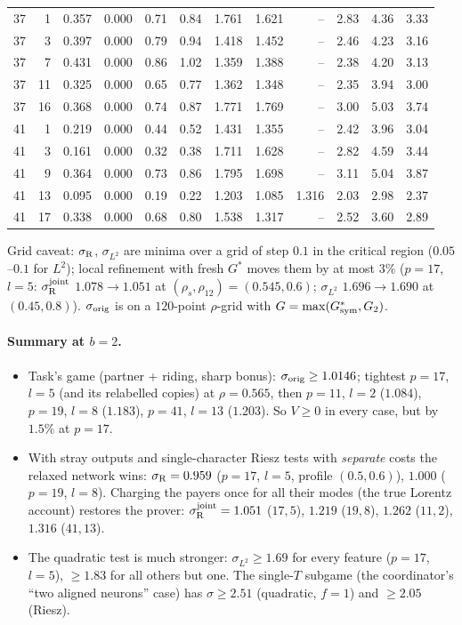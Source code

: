 \documentclass[11pt]{article}
\theoremstyle{definition}
\begin{document}
\begin{center}
\begin{longtable}{rr|rr|rr|r|rr|r|rr}
37 & 1 & 0.357 & 0.000 & 0.71 & 0.84 & 1.761 & 1.621 & -- & 2.83 & 4.36 & 3.33\\
37 & 3 & 0.397 & 0.000 & 0.79 & 0.94 & 1.418 & 1.452 & -- & 2.46 & 4.23 & 3.16\\
37 & 7 & 0.431 & 0.000 & 0.86 & 1.02 & 1.359 & 1.388 & -- & 2.38 & 4.20 & 3.13\\
37 & 11 & 0.325 & 0.000 & 0.65 & 0.77 & 1.362 & 1.348 & -- & 2.35 & 3.94 & 3.00\\
37 & 16 & 0.368 & 0.000 & 0.74 & 0.87 & 1.771 & 1.769 & -- & 3.00 & 5.03 & 3.74\\
41 & 1 & 0.219 & 0.000 & 0.44 & 0.52 & 1.431 & 1.355 & -- & 2.42 & 3.96 & 3.04\\
41 & 3 & 0.161 & 0.000 & 0.32 & 0.38 & 1.711 & 1.628 & -- & 2.82 & 4.59 & 3.44\\
41 & 9 & 0.364 & 0.000 & 0.73 & 0.86 & 1.795 & 1.698 & -- & 3.11 & 5.04 & 3.87\\
41 & 13 & 0.095 & 0.000 & 0.19 & 0.22 & 1.203 & 1.085 & 1.316 & 2.03 & 2.98 & 2.37\\
41 & 17 & 0.338 & 0.000 & 0.68 & 0.80 & 1.538 & 1.317 & -- & 2.52 & 3.60 & 2.89\\
\bottomrule
\end{longtable}
\end{center}
Grid caveat: $\sigma_{\rm R}$, $\sigma_{L^2}$ are minima over a grid of step $0.1$ in the critical region ($0.05$--$0.1$ for $L^2$); local refinement with fresh $G^*$
moves them by at most $3\%$ ($p=17$, $l=5$: $\sigma_{\rm R}^{\rm joint}$ $1.078\to1.051$ at $(\rho_s,\rho_{12})=(0.545,0.6)$; $\sigma_{L^2}$ $1.696\to1.690$ at $(0.45,0.8)$).
$\sigma_{\rm orig}$ is on a $120$-point $\rho$-grid with $G=\max(G^*_{\rm sym},G_2)$.

\paragraph{Summary at $b=2$.}
\begin{itemize}
\item Task's game (partner + riding, sharp bonus): $\sigma_{\rm orig}\ge1.0146$; tightest $p=17$, $l=5$ (and its relabelled copies) at $\rho=0.565$, then $p=11$, $l=2$ ($1.084$),
$p=19$, $l=8$ ($1.183$), $p=41$, $l=13$ ($1.203$).  So $V\ge0$ in every case, but by $1.5\%$ at $p=17$.
\item With stray outputs and single-character Riesz tests with \emph{separate} costs the relaxed network wins: $\sigma_{\rm R}=0.959$ ($p=17$, $l=5$, profile $(0.5,0.6)$),
$1.000$ ($p=19$, $l=8$).  Charging the payers once for all their modes (the true Lorentz account) restores the prover: $\sigma_{\rm R}^{\rm joint}=1.051$ ($17,5$),
$1.219$ ($19,8$), $1.262$ ($11,2$), $1.316$ ($41,13$).
\item The quadratic test is much stronger: $\sigma_{L^2}\ge1.69$ for every feature ($p=17$, $l=5$), $\ge1.83$ for all others but one.  The single-$T$ subgame
(the coordinator's ``two aligned neurons'' case) has $\sigma\ge2.51$ (quadratic, $f=1$) and $\ge2.05$ (Riesz).
\end{itemize}
\end{document}
